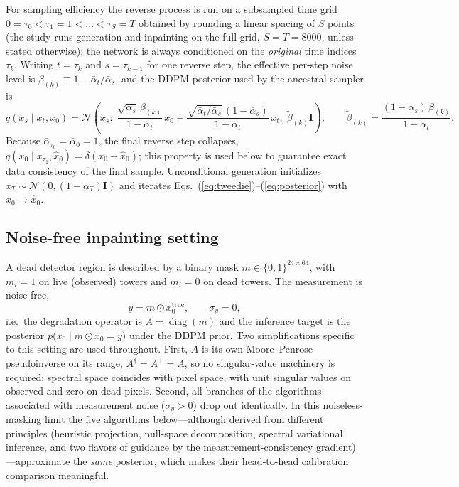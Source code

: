 For sampling efficiency the reverse process is run on a subsampled time
grid $0 = \tau_0 < \tau_1 = 1 < \dots < \tau_S = T$ obtained by rounding a
linear spacing of $S$ points (the study runs generation and inpainting on
the full grid, $S = T = 8000$, unless stated otherwise); the
network is always conditioned on the \emph{original} time indices
$\tau_k$.  Writing $t = \tau_k$ and $s = \tau_{k-1}$ for one reverse step,
the effective per-step noise level is
$\beta_{(k)} \equiv 1 - \bar\alpha_t/\bar\alpha_s$, and the DDPM posterior
used by the ancestral sampler is
\begin{equation}
  q(x_s \mid x_t, x_0)
  = \mathcal{N}\!\left(x_s;\;
      \frac{\sqrt{\bar\alpha_s}\,\beta_{(k)}}{1-\bar\alpha_t}\, x_0
      + \frac{\sqrt{\bar\alpha_t/\bar\alpha_s}\,(1-\bar\alpha_s)}
             {1-\bar\alpha_t}\, x_t,\;
      \tilde\beta_{(k)} \mathbf{I}\right),
  \qquad
  \tilde\beta_{(k)} = \frac{(1-\bar\alpha_s)\,\beta_{(k)}}{1-\bar\alpha_t}.
  \label{eq:posterior}
\end{equation}
Because $\bar\alpha_{\tau_0} = \bar\alpha_0 = 1$, the final reverse step
collapses, $q(x_0 \mid x_{\tau_1}, \hat x_0) = \delta(x_0 - \hat x_0)$;
this property is used below to guarantee exact data consistency of the
final sample.  Unconditional generation initializes
$x_T \sim \mathcal{N}(0, (1-\bar\alpha_T)\mathbf{I})$ and iterates
Eqs.~(\ref{eq:tweedie})--(\ref{eq:posterior}) with $x_0 \to \hat x_0$.

\subsection{Noise-free inpainting setting}
\label{sec:inpainting:setting}

A dead detector region is described by a binary mask
$m \in \{0,1\}^{24\times 64}$, with $m_i = 1$ on live (observed) towers
and $m_i = 0$ on dead towers.  The measurement is noise-free,
\begin{equation}
  y = m \odot x_0^{\mathrm{true}},
  \qquad \sigma_y = 0,
  \label{eq:measurement}
\end{equation}
i.e.\ the degradation operator is $A = \operatorname{diag}(m)$ and the
inference target is the posterior
$p\bigl(x_0 \mid m \odot x_0 = y\bigr)$ under the DDPM prior.  Two
simplifications specific to this setting are used throughout.  First,
$A$ is its own Moore--Penrose pseudoinverse on its range,
$A^\dagger = A^{\!\top} = A$, so no singular-value machinery is required:
spectral space coincides with pixel space, with unit singular values on
observed and zero on dead pixels.  Second, all branches of the algorithms
associated with measurement noise ($\sigma_y > 0$) drop out identically.
In this noiseless-masking limit the five algorithms below---although
derived from different principles (heuristic projection, null-space
decomposition, spectral variational inference, and two flavors of
guidance by the measurement-consistency gradient)---approximate the
\emph{same} posterior, which makes their head-to-head calibration
comparison meaningful.

